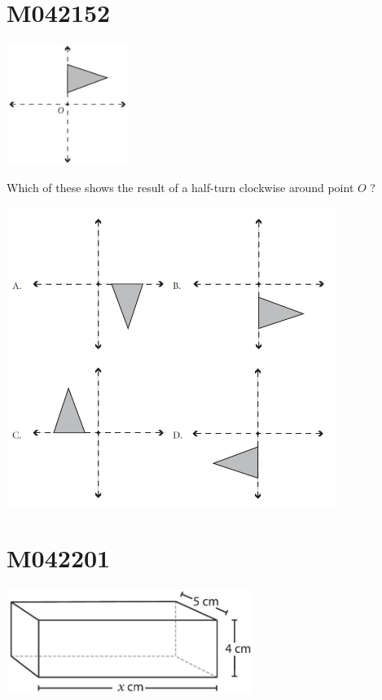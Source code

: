 \documentclass[12pt]{article}
\begin{document}
\newpage
\section*{M042152}


\includegraphics[max width=0.3\textwidth]{2024_02_20_828ebc9d68bcc1fbb223g-63}


Which of these shows the result of a half-turn clockwise around point $O$ ?

\includegraphics[max width=0.8\textwidth]{2024_02_20_828ebc9d68bcc1fbb223g-63(2)}

\newpage
\section*{M042201}


\includegraphics[max width=0.6\textwidth]{2024_02_20_828ebc9d68bcc1fbb223g-64}
\end{document}
